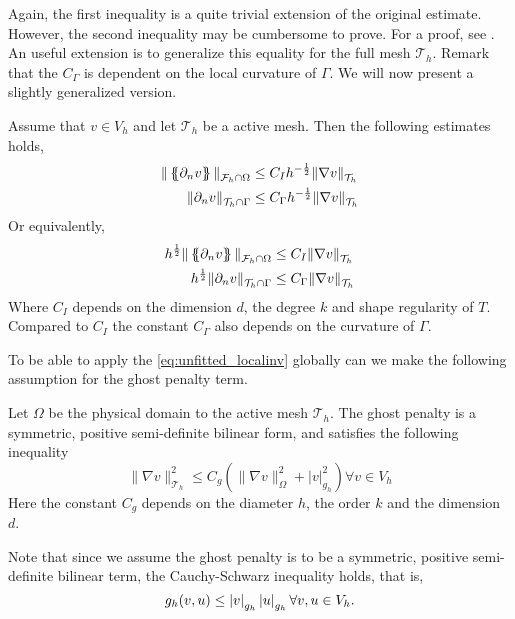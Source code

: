 Again, the first inequality is a quite trivial extension of the original estimate. However, the second inequality may be cumbersome to prove. For a proof, see \cite{hansbo2003finite}.
An useful extension is to generalize this equality for the full mesh $\mathcal{T} _{h}$.
Remark that the $C_{\Gamma } $ is dependent on the local curvature of $\Gamma $. 
We will now present a slightly generalized version.
\begin{corollary}
    \label{cor:unfitted_inverse_estimates}
    Assume that $v \in V_{h} $ and let $\mathcal{T}_{h} $ be a active mesh. Then the following estimates holds,
    \[
\begin{split}
    \| \left\{\!\!\left\{ \partial _{n} v \right\}\!\!\right\}   \|_{ \mathcal{F}_h \cap \Omega  }^{  } & \le   C_{I} h ^{-\frac{1}{2}} \| \nabla v \|_{ \mathcal{T}_{h}  }^{  } \\
    \| \partial _{n} v \|_{ \mathcal{T}_{h} \cap \Gamma   }^{  } &  \le  C_{\Gamma } h ^{-\frac{1}{2}} \| \nabla v \|_{ \mathcal{T} _{h} }^{  } \\
\end{split}
    \]
    Or equivalently,
    \[
\begin{split}
    h^{\frac{1}{2}}\| \left\{\!\!\left\{ \partial _{n} v \right\}\!\!\right\} \|_{ \mathcal{F}_h \cap \Omega  }^{  } & \le  C_{I}  \| \nabla v \|_{ \mathcal{T}_{h}  }^{  } \\
    h^{\frac{1}{2}}\| \partial _{n} v \|_{ \mathcal{T}_{h} \cap \Gamma   }^{  } &  \le  C_{\Gamma }  \| \nabla v \|_{ \mathcal{T} _{h} }^{  } \\
\end{split}
    \]
Where $C_{I}$ depends on the dimension $d$, the degree $k$ and shape regularity of $T$. Compared to $C_{I}$ the constant $C_{\Gamma }$ also depends on the curvature of $\Gamma $.
\end{corollary}


To be able to apply the \eqref{eq:unfitted_localinv} globally can we make the following assumption for the ghost penalty term.

\begin{assumption}[EP1]
    \label{as:est_EP1}
    Let $\Omega $ be the physical domain to the active mesh $\mathcal{T} _{h}$. The ghost penalty is a symmetric, positive semi-definite bilinear form, and satisfies the following inequality  \[
    \| \nabla v \|_{ \mathcal{T}_{h}  }^{ 2 }  \le C_{g} ( \| \nabla v \|_{ \Omega  }^{ 2 }  + \left\lvert v  \right\rvert _{ g_{h} }^{ 2 } ) \forall v \in  V_{h}
    \]
    Here the constant $C_{g}$ depends on the diameter $h$, the order $k $ and the dimension $d$.
\end{assumption}
\begin{remark}
Note that since we assume the ghost penalty is to be a symmetric, positive semi-definite bilinear term, the Cauchy-Schwarz inequality holds, that is,\[
g_{h}( v,u)  \le \left\lvert  v  \right\rvert _{g_{h}} \left\lvert  u  \right\rvert_{g_{h}} \forall v,u \in V_{h}.
\]
\end{remark}


